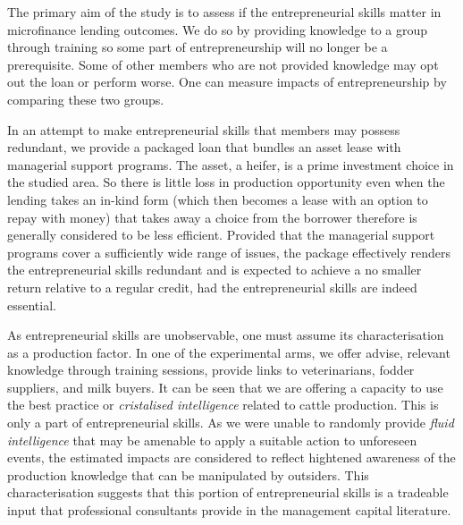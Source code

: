 	The primary aim of the study is to assess if the entrepreneurial skills matter in microfinance lending outcomes. We do so by providing knowledge to a group through training so some part of entrepreneurship will no longer be a prerequisite. Some of other members who are not provided knowledge may opt out the loan or perform worse. One can measure impacts of entrepreneurship by comparing these two groups.

	In an attempt to make entrepreneurial skills that members may possess redundant, we provide a packaged loan that bundles an asset lease with managerial support programs. The asset, a heifer, is a prime investment choice in the studied area. So there is little loss in production opportunity even when the lending takes an in-kind form (which then becomes a lease with an option to repay with money) that takes away a choice from the borrower therefore is generally considered to be less efficient. Provided that the managerial support programs cover a sufficiently wide range of issues, the package effectively renders the entrepreneurial skills redundant and is expected to achieve a no smaller return relative to a regular credit, had the entrepreneurial skills are indeed essential. 

	As entrepreneurial skills are unobservable, one must assume its characterisation as a production factor. In one of the experimental arms, we offer advise, relevant knowledge through training sessions, provide links to veterinarians, fodder suppliers, and milk buyers. It can be seen that we are offering a capacity to use the best practice or \textit{cristalised intelligence} related to cattle production. This is only a part of entrepreneurial skills. As we were unable to randomly provide \textit{fluid intelligence} that may be amenable to apply a suitable action to unforeseen events, the estimated impacts are considered to reflect hightened awareness of the production knowledge that can be manipulated by outsiders. This characterisation suggests that this portion of entrepreneurial skills is a tradeable input that professional consultants provide in the management capital literature. %

